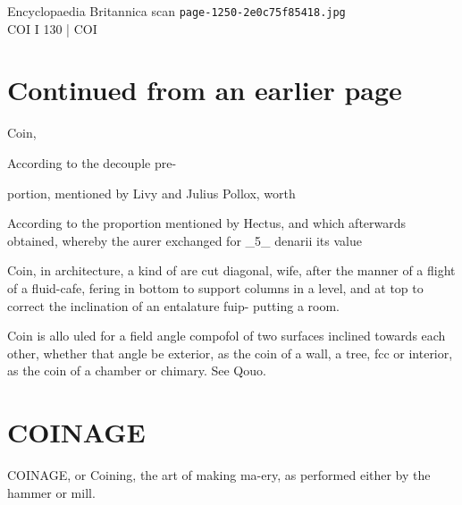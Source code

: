 \documentclass{article}
\begin{document}
\begin{center}
{\Large Encyclopaedia Britannica scan \texttt{page-1250-2e0c75f85418.jpg}}\\[0.5em]
COI I 130 | COI
\end{center}
\section*{Continued from an earlier page}
Coin,

According to the decouple pre-

portion, mentioned by Livy and Julius Pollox, worth

According to the proportion mentioned by Hectus, and which afterwards obtained, whereby the aurer exchanged for \_5\_ denarii its value

Coin, in architecture, a kind of are cut diagonal, wife, after the manner of a flight of a fluid-cafe, fering in bottom to support columns in a level, and at top to correct the inclination of an entalature fuip- putting a room.

Coin is allo uled for a field angle compofol of two surfaces inclined towards each other, whether that angle be exterior, as the coin of a wall, a tree, fcc or interior, as the coin of a chamber or chimary. See Qouo.

\section*{COINAGE}
COINAGE, or Coining, the art of making ma-ery, as performed either by the hammer or mill.
\end{document}
